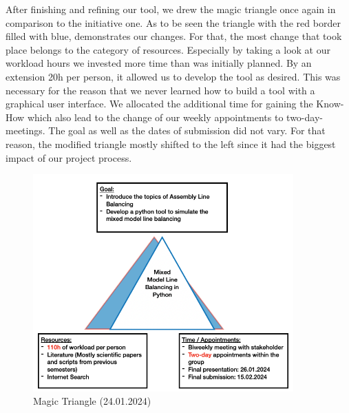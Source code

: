 After finishing and refining our tool, we drew the magic triangle once again in comparison to the initiative one. As to be seen the triangle with the red border filled with blue, demonstrates our changes. For that, the most change that took place belongs to the category of resources. Especially by taking a look at our workload hours we invested more time than was initially planned. By an extension 20h per person, it allowed us to develop the tool as desired. This was necessary for the reason that we never learned how to build a tool with a graphical user interface. We allocated the additional time for gaining the Know-How which also lead to the change of our weekly appointments to two-day-meetings. The goal as well as the dates of submission did not vary. For that reason, the modified triangle mostly shifted to the left since it had the biggest impact of our project process.
\begin{figure}[H]
\centering
\includegraphics[width=10cm]{Abbildungen/Magic_Triangle_end.png}
\caption{Magic Triangle (24.01.2024)}
\label{fig:Magic_Triangle_end}
\end{figure}
